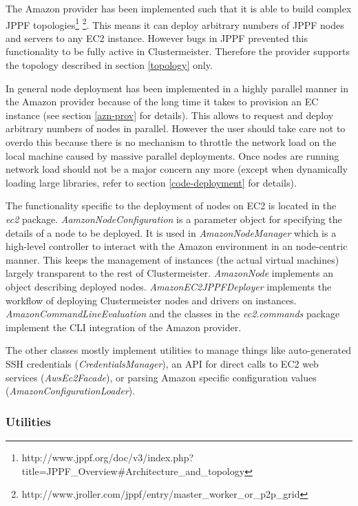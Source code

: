 \documentclass[english]{uzhpub}
\begin{document}
The Amazon provider has been implemented such that it is able to build complex JPPF topologies\footnote{http://www.jppf.org/doc/v3/index.php?title=JPPF\_Overview\#Architecture\_and\_topology} \footnote{http://www.jroller.com/jppf/entry/master\_worker\_or\_p2p\_grid}. This means it can deploy arbitrary numbers of JPPF nodes and servers to any EC2 instance. However bugs in JPPF prevented this functionality to be fully active in Clustermeister. Therefore the provider supports the topology described in section \ref{topology} only.

In general node deployment has been implemented in a highly parallel manner in the Amazon provider because of the long time it takes to provision an EC instance (see section \ref{azn-prov} for details). This allows to request and deploy arbitrary numbers of nodes in parallel. However the user should take care not to overdo this because there is no mechanism to throttle the network load on the local machine caused by massive parallel deployments. Once nodes are running network load should not be a major concern any more (except when dynamically loading large libraries, refer to section \ref{code-deployment} for details).

The functionality specific to the deployment of nodes on EC2 is located in the \textit{ec2} package. \textit{AamzonNodeConfiguration} is a parameter object for specifying the details of a node to be deployed. It is used in \textit{AmazonNodeManager} which is a high-level controller to interact with the Amazon environment in an node-centric manner. This keeps the management of instances (the actual virtual machines) largely transparent to the rest of Clustermeister. \textit{AmazonNode} implements an object describing deployed nodes. \textit{AmazonEC2JPPFDeployer} implements the workflow of deploying Clustermeister nodes and drivers on instances. \textit{AmazonCommandLineEvaluation} and the classes in the \textit{ec2.commands} package implement the CLI integration of the Amazon provider.

The other classes mostly implement utilities to manage things like auto-generated SSH credentials (\textit{CredentialsManager}), an API for direct calls to EC2 web services (\textit{AwsEc2Facade}), or parsing Amazon specific configuration values (\textit{AmazonConfigurationLoader}).

\subsubsection{Utilities}
\end{document}

